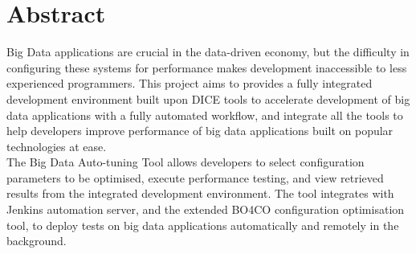 \section{Abstract}
Big Data applications are crucial in the data-driven economy, but the difficulty in configuring these systems for performance makes development inaccessible to less experienced programmers. This project aims to provides a fully integrated development environment built upon DICE tools to accelerate development of big data applications with a fully automated workflow, and integrate all the tools to help developers improve performance of big data applications built on popular technologies at ease.\\
The Big Data Auto-tuning Tool allows developers to select configuration parameters to be optimised, execute performance testing, and view retrieved results from the integrated development environment. The tool integrates with Jenkins automation server, and the extended BO4CO configuration optimisation tool, to deploy tests on big data applications automatically and remotely in the background.